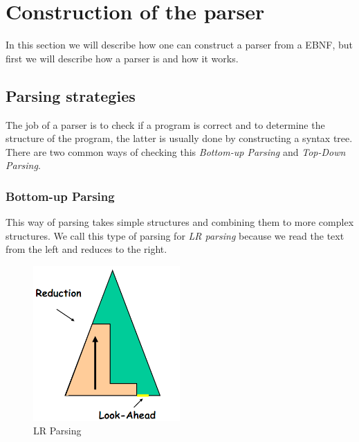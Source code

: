\section{Construction of the parser}
	In this section we will describe how one can construct a parser from a EBNF, but first we will describe how a parser is and how it works.
	
	\subsection{Parsing strategies}
		The job of a parser is to check if a program is correct and 
		to determine the structure of the program, the latter is usually done by constructing a syntax tree.
		There are two common ways of checking this {\it Bottom-up Parsing} and {\it Top-Down Parsing}.
		
		\subsubsection*{Bottom-up Parsing}
			This way of parsing takes simple structures and combining them to more complex structures.
			We call this type of parsing for {\it LR parsing} because we read the text from the left and reduces to the right.
			\begin{figure}[H]
				\centering
				\includegraphics[width=0.5\textwidth]{rapport/2/figures/bottomup.png}
				\caption{LR Parsing}\label{fig:lrparse}
			\end{figure}
			
